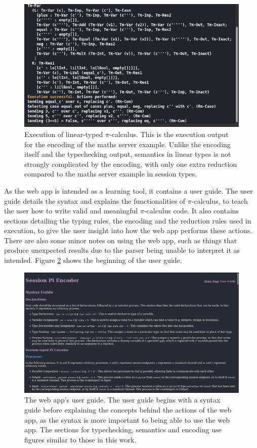 \documentclass{l4proj}
\begin{document}
\begin{figure}[H]
\centering
\includegraphics[width=\textwidth]{images/InterfaceScreenshotLinExe.png}
\caption{Execution of linear-typed $\pi$-calculus. This is the execution output for the encoding of the maths server example. Unlike the encoding itself and the typechecking output, semantics in linear types is not strongly complicated by the encoding, with only one extra reduction compared to the maths server example in session types.}
\label{fig:scshLSem}
\end{figure}

\quad As the web app is intended as a learning tool, it contains a user guide. The user guide details the syntax and explains the functionalities of $\pi$-calculus, to teach the user how to write valid and meaningful $\pi$-calculus code. It also contains sections detailing the typing rules, the encoding and the reduction rules used in execution, to give the user insight into how the web app performs these actions. There are also some minor notes on using the web app, such as things that produce unexpected results due to the parser being unable to interpret it as intended. Figure \ref{fig:scshGuide} shows the beginning of the user guide.

\begin{figure}[H]
\centering
\includegraphics[width=\textwidth]{images/InterfaceScreenshotGuide.png}
\caption{The web app's user guide. The user guide begins with a syntax guide before explaining the concepts behind the actions of the web app, as the syntax is more important to being able to use the web app. The sections for typechecking, semantics and encoding use figures similar to those in this work.}
\label{fig:scshGuide}
\end{figure}
\end{document}
